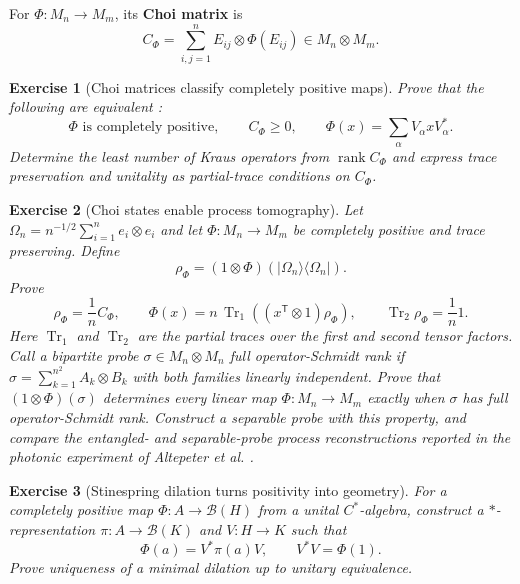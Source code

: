 \documentclass{article}
\newtheorem{exercise}{Exercise}
\begin{document}
For $\Phi:M_n\to M_m$, its \textbf{Choi matrix} is
\[
C_\Phi=\sum_{i,j=1}^n E_{ij}\otimes\Phi(E_{ij})\in M_n\otimes M_m.
\]

\begin{exercise}[Choi matrices classify completely positive maps]
\leavevmode\par
\textit{Prove that the following are equivalent \cite{choi-cp}:}
\[
\Phi\text{ is completely positive},
\qquad
C_\Phi\geq0,
\qquad
\Phi(x)=\sum_\alpha V_\alpha xV_\alpha^*.
\]
\textit{Determine the least number of Kraus operators from
$\operatorname{rank}C_\Phi$ and express trace preservation and unitality as
partial-trace conditions on $C_\Phi$.}
\end{exercise}

\begin{exercise}[Choi states enable process tomography]
\leavevmode\par
\textit{Let
$\Omega_n=n^{-1/2}\sum_{i=1}^n e_i\otimes e_i$ and let
$\Phi:M_n\to M_m$ be completely positive and trace preserving. Define}
\[
\rho_\Phi=(1\otimes\Phi)(|\Omega_n\rangle\langle\Omega_n|).
\]
\textit{Prove}
\[
\rho_\Phi=\frac1nC_\Phi,
\qquad
\Phi(x)=n\,\operatorname{Tr}_1
\!\left((x^{\mathsf T}\otimes1)\rho_\Phi\right),
\qquad
\operatorname{Tr}_2\rho_\Phi=\frac1n1.
\]
\textit{Here $\operatorname{Tr}_1$ and $\operatorname{Tr}_2$ are the partial
traces over the first and second tensor factors. Call a bipartite probe
$\sigma\in M_n\otimes M_n$ full
operator-Schmidt rank if
$\sigma=\sum_{k=1}^{n^2}A_k\otimes B_k$ with both families linearly
independent. Prove that $(1\otimes\Phi)(\sigma)$ determines every linear map
$\Phi:M_n\to M_m$ exactly when $\sigma$ has full operator-Schmidt rank.
Construct a separable probe with this property, and compare the entangled-
and separable-probe process reconstructions reported in the photonic
experiment of Altepeter et al. \cite{altepeter-tomography}.}
\end{exercise}

\begin{exercise}[Stinespring dilation turns positivity into geometry]
\leavevmode\par
\textit{For a completely positive map
$\Phi:A\to\mathcal B(H)$ from a unital $C^*$-algebra, construct a
$*$-representation $\pi:A\to\mathcal B(K)$ and $V:H\to K$ such that}
\cite{stinespring}
\[
\Phi(a)=V^*\pi(a)V,
\qquad
V^*V=\Phi(1).
\]
\textit{Prove uniqueness of a minimal dilation up to unitary equivalence.}
\end{exercise}
\end{document}
